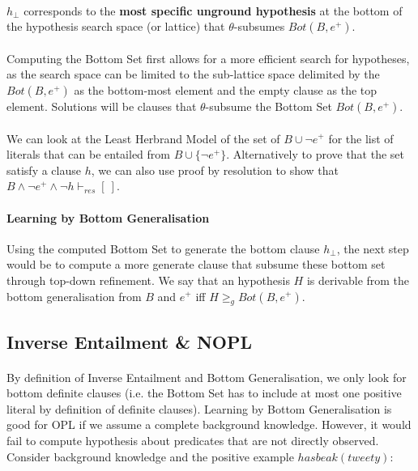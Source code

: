 \documentclass{article}
\theoremstyle{plain}
\theoremstyle{definition}
\begin{document}
\begin{multicols}{2}
\paragraph{} $h_{\perp}$ corresponds to the \textbf{most specific unground hypothesis} at the bottom of the hypothesis search space (or lattice) that $\theta$-subsumes $Bot(B, e^+)$. 

\paragraph{} Computing the Bottom Set first allows for a more efficient search for hypotheses, as the search space can be limited to the sub-lattice space delimited by the $Bot(B, e^+)$ as the bottom-most element and the empty clause as the top element. Solutions will be clauses that $\theta$-subsume the Bottom Set $Bot(B, e^+)$.

\paragraph{} We can look at the Least Herbrand Model of the set of $B \cup {\lnot e^+}$ for the list of literals that can be entailed from $B \cup \{\lnot e^+\}$. Alternatively to prove that the set satisfy a clause $h$, we can also use proof by resolution to show that $B \land \lnot e^+ \land \lnot h \vdash_{res} [\ ]$.

\paragraph{Learning by Bottom Generalisation} Using the computed Bottom Set to generate the bottom clause $h_{\perp}$, the next step would be to compute a more generate clause that subsume these bottom set through top-down refinement. We say that an hypothesis $H$ is derivable from the bottom generalisation from $B$ and $e^+$ iff $H \geq_g Bot(B, e^+)$. 

\subsection{Inverse Entailment \& NOPL}

\paragraph{} By definition of Inverse Entailment and Bottom Generalisation, we only look for bottom definite clauses (i.e. the Bottom Set has to include at most one positive literal by definition of definite clauses). Learning by Bottom Generalisation is good for OPL if we assume a complete background knowledge. However, it would fail to compute hypothesis about predicates that are not directly observed. Consider background knowledge and the positive example $hasbeak(tweety)$:


\end{multicols}
\end{document}
